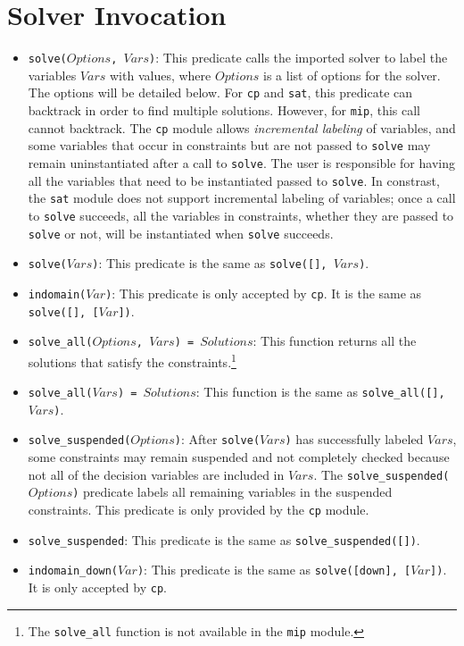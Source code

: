 \section{Solver Invocation}
\begin{itemize}
\item \texttt{solve($Options$, $Vars$)}: This predicate calls the imported solver to label the variables $Vars$ with values, where $Options$ is a list of options for the solver. The options will be detailed below. For \texttt{cp} and \texttt{sat}, this predicate can backtrack in order to find multiple solutions. However, for \texttt{mip}, this call cannot backtrack. The \texttt{cp} module allows \textit{incremental labeling} of variables, and some variables that occur in constraints but are not passed to \texttt{solve} may remain uninstantiated after a call to \texttt{solve}. The user is responsible for having all the variables that need to be instantiated passed to \texttt{solve}. In constrast, the \texttt{sat} module does not support incremental labeling of variables; once a call to \texttt{solve} succeeds, all the variables in constraints, whether they are passed to \texttt{solve} or not, will be instantiated when \texttt{solve} succeeds.
\item\texttt{solve($Vars$)}: This predicate is the same as \texttt{solve([], $Vars$)}. 
\item \texttt{indomain($Var$)}: This predicate is only accepted by \texttt{cp}. It is the same as \texttt{solve([], [$Var$])}.
\item \texttt{solve\_all($Options$, $Vars$) = $Solutions$}: This function returns all the solutions that satisfy the constraints.\footnote{The \texttt{solve\_all} function is not available in the \texttt{mip} module.}
\item \texttt{solve\_all($Vars$) = $Solutions$}: This function is the same as \texttt{solve\_all([],$Vars$)}.
\item \texttt{solve\_suspended($Options$)}: After \texttt{solve($Vars$)} has successfully labeled $Vars$, some constraints may remain suspended and not completely checked because not all of the decision variables are included in $Vars$. The \texttt{solve\_suspended($Options$)} predicate labels all remaining variables in the suspended constraints. This predicate is only provided by the \texttt{cp} module. 
\item \texttt{solve\_suspended}: This predicate is the same as \texttt{solve\_suspended([])}.
\item \texttt{indomain\_down($Var$)}: This predicate is the same as \texttt{solve([down], [$Var$])}. It is only accepted by \texttt{cp}. 
\end{itemize}


